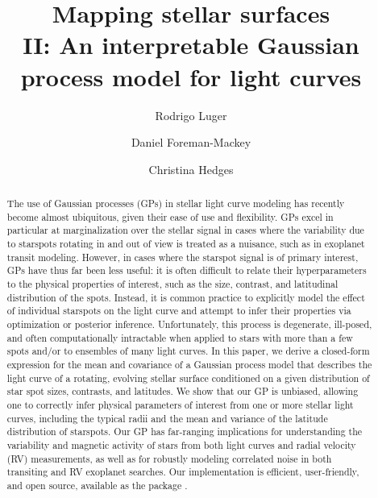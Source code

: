 \documentclass[modern]{aastex62}
\begin{document}
\title{%
    \textbf{
        Mapping stellar surfaces\\
        II: An interpretable Gaussian process model for light curves
    }
}

\author[0000-0002-0296-3826]{Rodrigo Luger}
%
\author[0000-0002-9328-5652]{Daniel Foreman-Mackey}
%
\author[0000-0002-3385-8391]{Christina Hedges}
%



\begin{abstract}
    The use of Gaussian processes (GPs) in stellar light curve modeling has recently
    become almost ubiquitous, given their ease of use and flexibility.
    GPs excel in particular at marginalization
    over the stellar signal in cases where the
    variability due to starspots rotating in and out of view is treated
    as a nuisance, such as in exoplanet transit modeling.
    However, in cases where the starspot signal is of primary interest,
    GPs have thus far been less useful: it is often difficult to
    relate their hyperparameters to the physical properties of interest, such
    as the size, contrast, and latitudinal distribution of the spots.
    Instead, it is common practice to explicitly model the effect
    of individual starspots on the light curve and attempt to infer their
    properties via optimization or posterior inference. Unfortunately,
    this process is
    degenerate, ill-posed, and often computationally intractable when
    applied to stars with more than a few spots and/or to ensembles of many
    light curves.
    In this paper, we derive a closed-form expression for the
    mean and covariance of a Gaussian process model that describes
    the light curve of a rotating, evolving stellar surface
    conditioned on a given distribution of
    star spot sizes, contrasts, and latitudes.
    We show that our GP is unbiased,
    allowing one to correctly infer physical parameters of interest from one
    or more stellar light curves, including
    the typical radii and the mean and variance of the latitude
    distribution of starspots.
    Our GP has far-ranging implications for understanding the variability and
    magnetic activity of stars from both light curves and radial velocity (RV)
    measurements, as well as for robustly modeling correlated noise in both transiting
    and RV exoplanet searches.
    Our implementation is efficient, user-friendly, and open source, available
    as the \Python package \starryprocess.
    \href{https://github.com/rodluger/starry_process}{\color{linkcolor}\faGithub}
\end{abstract}
\end{document}
